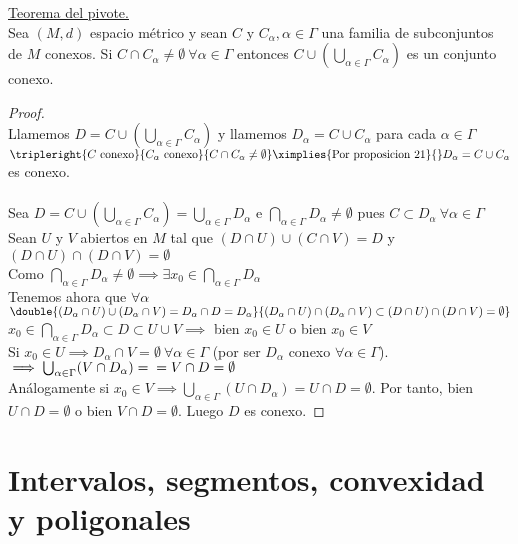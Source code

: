	\begin{teor} \underline{Teorema del pivote.}\\
		Sea $(M, d)$ espacio métrico y sean $C$ y $C_\alpha,\alpha\in \Gamma$ una familia de subconjuntos de $M$ conexos. Si $C\cap C_\alpha\neq\emptyset\ \forall \alpha\in\Gamma$ entonces $C\cup(\bigcup_{\alpha\in\Gamma} C_{\alpha})$ es un conjunto conexo.
		\begin{proof}\ \\
		Llamemos $D= C\cup(\bigcup_{\alpha\in\Gamma} C_{\alpha})$ y llamemos $D_\alpha = C\cup C_\alpha$ para cada $\alpha\in\Gamma$\\
		$\tripleright{C \mathrm{\ conexo}}{C_\alpha \mathrm{\ conexo}}{C\cap C_\alpha\neq\emptyset} \ximplies{\mathrm{Por\ proposicion\ 21}}{}D_\alpha=C\cup C_\alpha$ es conexo.\\\\
		Sea $D = C\cup(\bigcup_{\alpha\in\Gamma} C_{\alpha}) = \bigcup_{\alpha\in\Gamma} D_\alpha$ e $\bigcap_{\alpha\in\Gamma} D_\alpha\neq\emptyset$ pues $C\subset D_\alpha\ \forall\alpha\in\Gamma$\\
		Sean $U$ y $V$ abiertos en $M$ tal que  $(D\cap U)\cup(C\cap V)= D$ y $(D\cap U)\cap(D\cap V)=\emptyset$\\
		 Como $\bigcap_{\alpha\in\Gamma}D_\alpha\neq\emptyset\implies\exists x_0\in\bigcap_{\alpha\in\Gamma}D_\alpha$\\
		 Tenemos ahora que $\forall\alpha$\\
		 $\double{(D_\alpha\cap U)\cup(D_\alpha\cap V)=D_\alpha\cap D= D_\alpha}
		 {(D_\alpha\cap U)\cap(D_\alpha\cap V)\subset(D\cap U)\cap(D\cap V)=\emptyset}$\\
		 $x_0\in\bigcap_{\alpha\in\Gamma}D_\alpha\subset D\subset U\cup V\implies$ bien $x_0\in U$ o bien $x_0\in V$\\
		 Si $x_0\in U\implies D_\alpha\cap V=\emptyset\ \forall \alpha\in\Gamma$ (por ser $D_\alpha$ conexo $\forall\alpha\in\Gamma$).$\implies \bigcup_{\alpha\in\Gamma}(V\cap D_\alpha)=\\=V\cap D = \emptyset$\\
		 Análogamente si $x_0\in V\implies \bigcup_{\alpha\in\Gamma}(U\cap D_\alpha)=U\cap D = \emptyset$. Por tanto, bien $U\cap D = \emptyset$ o bien $V\cap D = \emptyset$. Luego $D$ es conexo.
		\end{proof}
	\end{teor}
	
	\section{Intervalos, segmentos, convexidad y  poligonales}	
	
